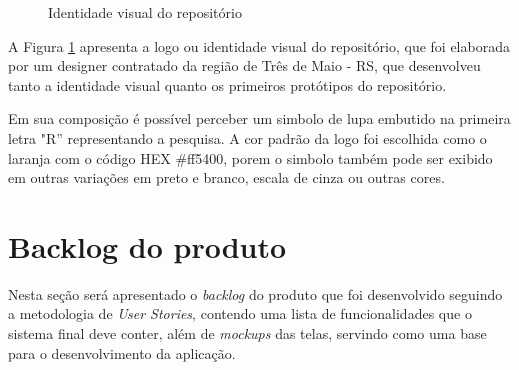 \begin{figure}[H]
    \caption{Identidade visual do repositório}
    \centering
    \label{fig:resoar}
\end{figure}

A Figura \ref{fig:resoar} apresenta a logo ou identidade visual do repositório,
que foi elaborada por um designer contratado da região de Três de Maio - RS,
que desenvolveu tanto a identidade visual quanto os primeiros protótipos do repositório.

Em sua composição é possível perceber um simbolo de lupa embutido na primeira letra "R''
representando a pesquisa. A cor padrão da logo foi escolhida como o laranja com
o código HEX \#ff5400, porem o simbolo também pode ser exibido em outras variações
em preto e branco, escala de cinza ou outras cores.

\section{Backlog do produto}

Nesta seção será apresentado o \emph{backlog} do produto que foi desenvolvido
seguindo a metodologia de \emph{User Stories}, contendo uma lista de funcionalidades
que o sistema final deve conter, além de \emph{mockups} das telas, servindo como uma
base para o desenvolvimento da aplicação.

